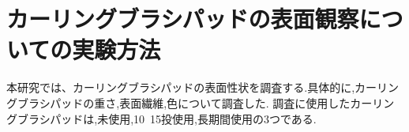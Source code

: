 \documentclass[main]{subfiles}
\begin{document}
\chapter{カーリングブラシパッドの表面観察についての実験方法}
本研究では、カーリングブラシパッドの表面性状を調査する.具体的に,カーリングブラシパッドの重さ,表面繊維,色について調査した.
調査に使用したカーリングブラシパッドは,未使用,10~15投使用,長期間使用の3つである.
\end{document}
